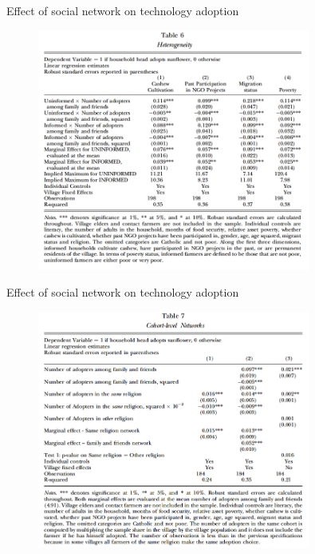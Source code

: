 \documentclass{beamer}
\begin{document}
\begin{frame}{Effect of social network on technology adoption}{}
\begin{figure}[h]
\begin{centering}
  \includegraphics[width=0.8\textwidth]{01table6}
   \label{fig:01table6}
\end{centering}
\end{figure}
\end{frame}

\begin{frame}{Effect of social network on technology adoption}{}
\begin{figure}[h]
\begin{centering}
  \includegraphics[width=0.8\textwidth]{01table7}
   \label{fig:01table7}
\end{centering}
\end{figure}
\end{frame}
\end{document}
